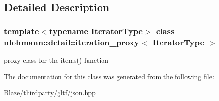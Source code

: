\subsection{Detailed Description}
\subsubsection*{template$<$typename Iterator\+Type$>$\newline
class nlohmann\+::detail\+::iteration\+\_\+proxy$<$ Iterator\+Type $>$}

proxy class for the items() function 

The documentation for this class was generated from the following file\+:\begin{DoxyCompactItemize}
\item 
Blaze/thirdparty/gltf/json.\+hpp\end{DoxyCompactItemize}
